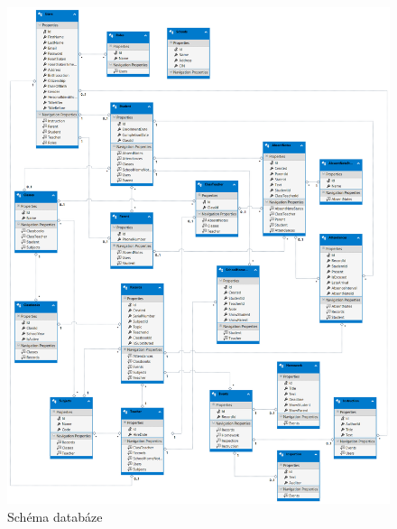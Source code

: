 \begin{figure}[h]
\begin{center}
	\includegraphics[width=1.14\textwidth]{images/db.png}
	\caption{Schéma databáze}
	\label{db-diagram}
\end{center}
\end{figure}    
